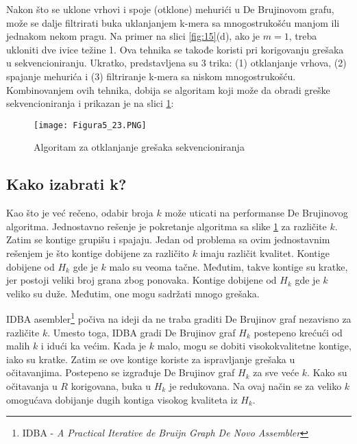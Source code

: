 \documentclass[12pt,oneside]{memoir}
\begin{document}
Nakon što se uklone vrhovi i spoje (otklone) mehurići u De Brujinovom grafu, može se dalje filtrirati buka uklanjanjem k-mera sa mnogostrukošću manjom ili jednakom nekom pragu. Na primer na slici \ref{fig:15}(d), ako je $m = 1$, treba ukloniti dve ivice težine 1. Ova tehnika se takođe koristi pri korigovanju grešaka u sekvencioniranju. Ukratko, predstavljena su 3 trika: (1) otklanjanje vrhova, (2) spajanje mehurića i (3) filtriranje k-mera sa niskom mnogostrukošću. Kombinovanjem ovih tehnika, dobija se algoritam koji može da obradi greške sekvencioniranja i prikazan je na slici \ref{fig:16}:

\begin{figure}[!ht]
\centering
\texttt{[image: Figura5\_23.PNG]}
\caption{Algoritam za otklanjanje grešaka sekvencioniranja}
\label{fig:16}
\end{figure}

\newpage

\subsection{Kako izabrati k?}

Kao što je već rečeno, odabir broja $k$ može uticati na performanse De Brujinovog algoritma. Jednostavno rešenje je pokretanje algoritma sa slike \ref{fig:16} za različite $k$. Zatim se kontige grupišu i spajaju. Jedan od problema sa ovim jednostavnim rešenjem je što kontige dobijene za različito $k$ imaju različit kvalitet. Kontige dobijene od $H_k$ gde je $k$ malo su veoma tačne. Međutim, takve kontige su kratke, jer postoji veliki broj grana zbog ponovaka. Kontige dobijene od $H_k$ gde je $k$ veliko su duže. Međutim, one mogu sadržati mnogo grešaka.

IDBA asembler\footnote{IDBA - \textit{A Practical Iterative de Bruijn Graph De Novo Assembler}} počiva na ideji da ne traba graditi De Brujinov graf nezavisno za različite $k$. Umesto toga, IDBA gradi De Brujinov graf $H_k$ postepeno krećući od malih $k$ i idući ka većim. Kada je $k$ malo, mogu se dobiti visokokvalitetne kontige, iako su kratke. Zatim se ove kontige koriste za ispravljanje grešaka u očitavanjima. Postepeno se izgrađuje De Brujinov graf $H_k$ za sve veće $k$. Kako su očitavanja u $R$ korigovana, buka u $H_k$ je redukovana. Na ovaj način se za veliko $k$ omogućava dobijanje dugih kontiga visokog kvaliteta iz $H_k$.

\begin{comment}
Slika \ref{fig:17} opisuje ideju IDBA asemblera:

\begin{figure}[!ht]
\centering
\texttt{[image: Figura5\_24.PNG]}
\caption{IDBA}
\label{fig:17}
\source{\cite{WingKinSung} str. 146, slika 5.24}
\end{figure}

\end{comment}
\end{document}
